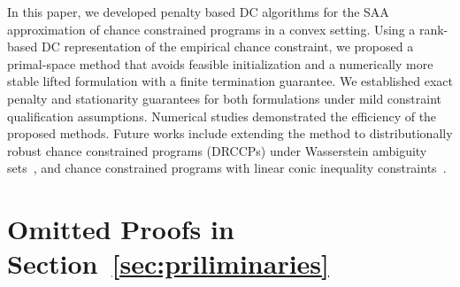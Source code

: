 \documentclass[11pt]{article}
\begin{document}
In this paper, we developed penalty based DC algorithms for the SAA approximation of chance constrained programs in a convex setting. Using a rank-based DC representation of the empirical chance constraint, we proposed a primal-space method that avoids feasible initialization and a numerically more stable lifted formulation with a finite termination guarantee. We established exact penalty and stationarity guarantees for both formulations under mild constraint qualification assumptions. Numerical studies demonstrated the efficiency of the proposed methods. Future works include extending the method to distributionally robust chance constrained programs (DRCCPs) under Wasserstein ambiguity sets~\cite{xie2021distributionally, chen2024data}, and chance constrained programs with linear conic inequality constraints~\cite{van2024inner}.





\appendix

\section{Omitted Proofs in Section~\ref{sec:priliminaries}}
\label{sec:proofs}
\end{document}

